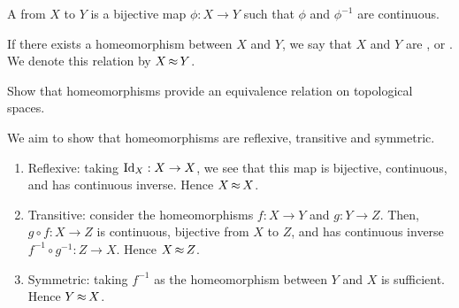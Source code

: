\begin{definition}[Homeomorphism]
	A  from $ X $ to $ Y $ is a bijective map $ \phi:X \to Y $ such that $ \phi $ and $ \phi ^{-1} $ are continuous.

	If there exists a homeomorphism between $ X $ and $ Y $, we say that $ X $ and $ Y $ are , or . We denote this relation by $ X \operatorname{\approx} Y $.
\end{definition}

\begin{exercise}
	\begin{problem}
	Show that homeomorphisms provide an equivalence relation on topological spaces.
	\end{problem}
	\begin{solution}
		We aim to show that homeomorphisms are reflexive, transitive and symmetric.
		\begin{enumerate}
			\item Reflexive: taking $ \operatorname{Id}_{X}:X \to X $, we see that this map is bijective, continuous, and has continuous inverse. Hence $ X \operatorname{\approx} X $.
			\item Transitive: consider the homeomorphisms $ f:X \to Y $ and $ g:Y \to Z $. Then, $ g \circ f:X \to Z $ is continuous, bijective from $ X $ to $ Z $, and has continuous inverse $ f ^{-1}\circ g ^{-1}: Z \to X $. Hence $ X \operatorname{\approx} Z $.
			\item Symmetric: taking $ f ^{-1} $ as the homeomorphism between $ Y $ and $ X $ is sufficient. Hence $ Y \operatorname{\approx} X $.
		\end{enumerate}
	\end{solution}
\end{exercise}

